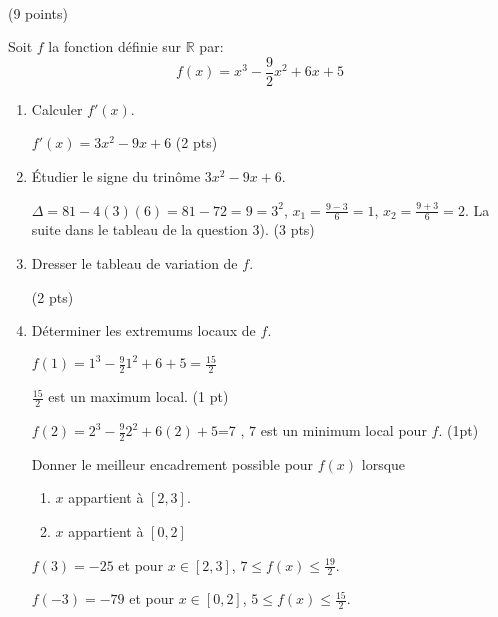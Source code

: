 \documentclass[a4paper,11pt]{article}
\theoremstyle{break}
\begin{document}
     ~
  \vspace{0.5cm}
  
    
\begin{exo}(9 points)
~
      \vspace{0.25cm}
      
 Soit $f$ la fonction définie sur $\mathbb{R}$ par:
 \[f(x)=x^3-\frac{9}{2}x^2+6x+5\]
 
 \begin{enumerate}
  \item Calculer $f'(x)$.
\begin{correction}

  $f'(x)=3x^2-9x+6$ (2 pts)
\end{correction}

  \item \'Etudier le signe du trinôme  $3x^2-9x+6$.
\begin{correction}

  $\Delta=81-4(3)(6)=81-72=9=3^2$, $x_1=\frac{9-3}{6}=1$,
  $x_2=\frac{9+3}{6}=2$. La suite dans le tableau de la
  question 3). (3 pts)
\end{correction}

  \item Dresser le tableau de variation de $f$.
\begin{correction}
  
    (2 pts)

\end{correction}

  \item Déterminer les extremums locaux de $f$.
\begin{correction}

  $f(1)=1^3-\frac{9}{2}1^2+6+5=\frac{15}{2}$
  
  $\frac{15}{2}$ est un maximum local. (1 pt)
  
  $f(2)=2^3-\frac{9}{2}2^2+6(2)+5$=7
  , $7$ est un minimum local pour $f$. (1pt)
\end{correction}  

\begin{item}
 Donner le meilleur encadrement possible pour $f(x)$ lorsque 
 \begin{enumerate}
 \item $x$ appartient à $[2,3]$.
  \item $x$ appartient à $[0,2]$
 \end{enumerate}

\begin{correction}
  $f(3)=-25$ et pour $x \in [2,3]$,  $7 \leq f(x) \leq \frac{19}{2}$.
  
  $f(-3)=-79$ et pour $x \in [0,2]$, $5 \leq f(x) \leq \frac{15}{2}$.
\end{correction} 
 
\end{item}
 \end{enumerate}

\end{exo}
\end{document}
